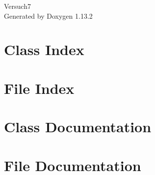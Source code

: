 \documentclass[twoside]{book}
\newcommand{\+}{\discretionary{\mbox{\scriptsize$\hookleftarrow$}}{}{}}
\newcommand{\clearemptydoublepage}{%
    \newpage{\pagestyle{empty}\cleardoublepage}%
  }
\begin{document}
  \raggedbottom
    \hypersetup{pageanchor=false,
                bookmarksnumbered=true,
                pdfencoding=unicode
               }
  \begin{titlepage}
  \vspace*{7cm}
  \begin{center}%
  {\Large Versuch7}\\
  \vspace*{1cm}
  {\large Generated by Doxygen 1.13.2}\\
  \end{center}
  \end{titlepage}
  \clearemptydoublepage
  \tableofcontents
  \clearemptydoublepage
  \hypersetup{pageanchor=true}
\chapter{Class Index}

\chapter{File Index}

\chapter{Class Documentation}

\chapter{File Documentation}






  \backmatter
  \newpage
  \clearemptydoublepage
  \printindex
\end{document}
